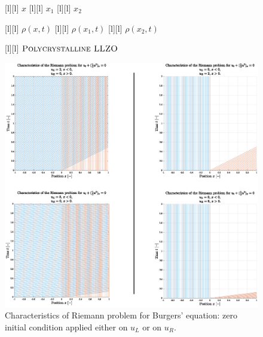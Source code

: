 \begin{figure}[ht]
	\centering
	\footnotesize

	[l] {$x$}
	[l] {$x_1$}
	[l] {$x_2$}

	[l] {$\rho(x,t)$}
	[l] {$\rho(x_{1},t)$}
	[l] {$\rho(x_{2},t)$}


	[l] {$\textsc{Polycrystalline LLZO}$}

	\includegraphics[width=1\textwidth]{charac02082080.eps}
	\caption{Characteristics of Riemann problem for Burgers' equation:
		zero initial condition applied either on $u_L$ or on $u_R$.}
	\label{\LABEL}
\end{figure}
